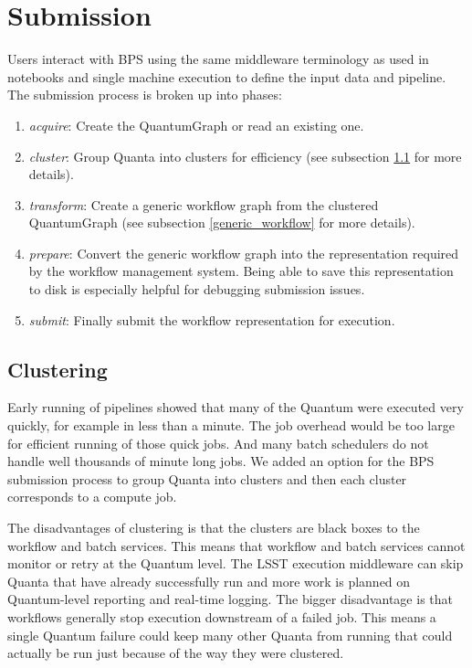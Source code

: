 \documentclass[11pt,twoside]{article}
\begin{document}
\section{Submission}
Users interact with BPS using the same middleware terminology as used
in notebooks and single machine execution to define the input data
and pipeline.  The submission process is broken up into phases:

\begin{enumerate}
\item \textit{acquire}: Create the QuantumGraph or read an existing one.

\item \textit{cluster}: Group Quanta into clusters for efficiency (see
subsection \ref{clustering} for more details).

\item \textit{transform}: Create a generic workflow graph from the
clustered QuantumGraph (see subsection \ref{generic_workflow} for more
details).

\item \textit{prepare}: Convert the generic workflow graph into the
representation required by the workflow management system.  Being able
to save this representation to disk is especially helpful for debugging
submission issues.

\item \textit{submit}: Finally submit the workflow representation for
execution.
\end{enumerate}

\subsection{Clustering} \label{clustering}

Early running of pipelines showed that many of the Quantum were
executed very quickly, for example in less than a minute.  The job
overhead would be too large for efficient running of those quick jobs.
And many batch schedulers do not handle well thousands of minute long
jobs.  We added an option for the BPS submission process to
group Quanta into clusters and then each cluster corresponds to
a compute job.

The disadvantages of clustering is that the clusters are black
boxes to the workflow and batch services.  This means that workflow
and batch services cannot monitor or retry at the Quantum level.
The LSST execution middleware can skip Quanta that have already
successfully run and more work is planned on Quantum-level reporting
and real-time logging.  The bigger disadvantage is that workflows
generally stop execution downstream of a failed job.  This means
a single Quantum failure could keep many other Quanta from running
that could actually be run just because of the way they were
clustered.
\end{document}
